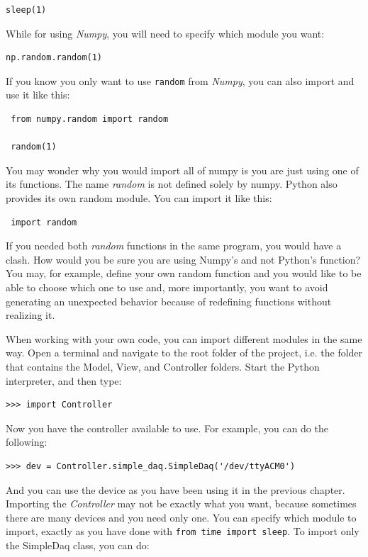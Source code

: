 \begin{verbatim}
sleep(1)
\end{verbatim}

While for using \emph{Numpy}, you will need to specify which module you want:

\begin{verbatim}
np.random.random(1)
\end{verbatim}

If you know you only want to use \texttt{random} from \emph{Numpy}, you can also import and use it like this:

\begin{verbatim}
 from numpy.random import random
 
 random(1)
\end{verbatim}

You may wonder why you would import all of numpy is you are just using one of its functions. The name \emph{random} is not defined solely by numpy. Python also provides its own random module. You can import it like this:

\begin{verbatim}
 import random
\end{verbatim}

If you needed both \emph{random} functions in the same program, you would have a clash. How would you be sure you are using Numpy's and not Python's function? You may, for example, define your own random function and you would like to be able to choose which one to use and, more importantly, you want to avoid generating an unexpected behavior because of redefining functions without realizing it. 

When working with your own code, you can import different modules in the same way. Open a terminal and navigate to the root folder of the project, i.e. the folder that contains the Model, View, and Controller folders. Start the Python interpreter, and then type:

\begin{verbatim}
>>> import Controller
\end{verbatim}

Now you have the controller available to use. For example, you can do the following:

\begin{verbatim}
>>> dev = Controller.simple_daq.SimpleDaq('/dev/ttyACM0')
\end{verbatim}

And you can use the device as you have been using it in the previous chapter. Importing the \emph{Controller} may not be exactly what you
want, because sometimes there are many devices and you need only one. You can specify which module to import, exactly as you have done with
\texttt{from time import sleep}. To import only the SimpleDaq class, you can do:

